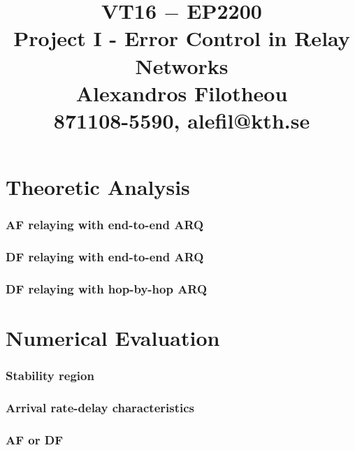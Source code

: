 \documentclass[a4paper,12pt,oneside,onecolumn]{article} %
\title{VT16 $-$ EP2200 \\
  Project I - Error Control in Relay Networks \\
  Alexandros Filotheou \\
  871108-5590, alefil@kth.se }
\date{}
\begin{document}
	\maketitle

  \part*{Theoretic Analysis}

    \section{AF relaying with end-to-end ARQ}
    

    \section{DF relaying with end-to-end ARQ}
    

    \section{DF relaying with hop-by-hop ARQ}
    


  \newpage
  \part*{Numerical Evaluation}

    \section{Stability region}
    

    \section*{Arrival rate-delay characteristics}
    

    \section*{AF or DF}
    
\end{document}
